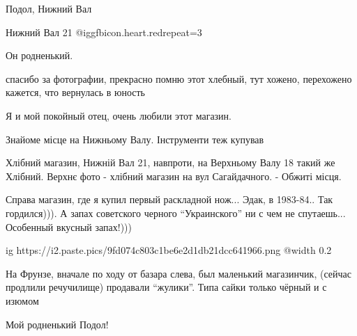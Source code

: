  
 
 
 
 

Подол, Нижний Вал

Нижний Вал 21 @igg{fbicon.heart.red}{repeat=3}

Он родненький.

спасибо за фотографии, прекрасно помню этот хлебный, тут хожено, перехожено кажется, что вернулась в юность

Я и мой покойный отец, очень любили этот магазин.

Знайоме місце на Нижньому Валу. Інструменти теж купував

Хлібний магазин, Нижній Вал 21, навпроти, на Верхньому Валу 18 такий же Хлібний. Верхнє фото - хлібний магазин на вул Сагайдачного. - Обжиті місця.


Справа магазин, где я купил первый раскладной нож... Эдак, в 1983-84.. Так
гордился))). А запах советского черного \enquote{Украинского} ни с чем не спутаешь...
Особенный вкусный запах!)))



\ifcmt
  ig https://i2.paste.pics/9fd074c803c1be6e2d1db21dcc641966.png
  @width 0.2
\fi


На Фрунзе, вначале по ходу от базара слева, был маленький магазинчик, (сейчас
продлили речучилище) продавали \enquote{жулики}. Типа сайки только чёрный и с изюмом

Мой родненький Подол!

